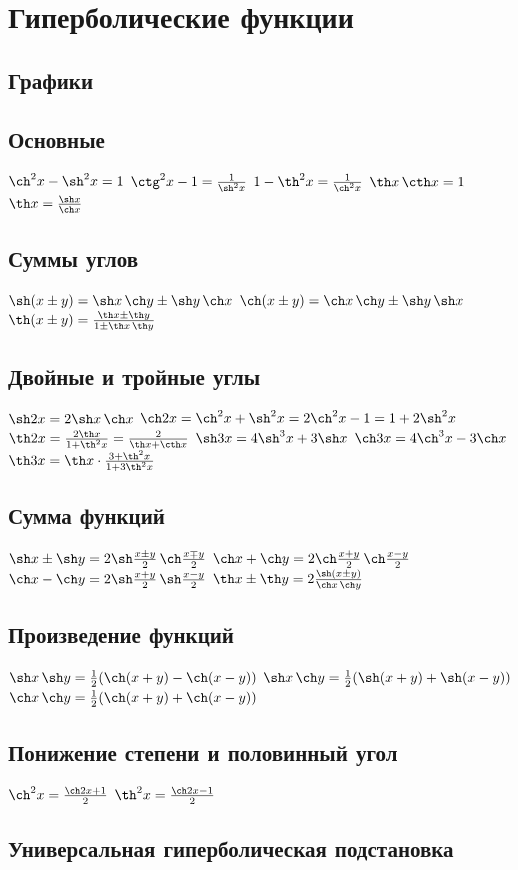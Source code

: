 \section{Гиперболические функции}
\subsection{Графики}
\subsection{Основные}
$ \ch^2 x - \sh^2 x = 1 $
$ \ctg^2 x - 1 = \frac{1}{\sh^2 x} $
$ 1 - \th^2 x = \frac{1}{\ch^2 x} $
$ \th x \, \cth x = 1 $
$ \th x = \frac{\sh x}{\ch x} $
\subsection{Суммы углов}
$ \sh(x \pm y) = \sh x \, \ch y \pm \sh y \, \ch x $
$ \ch(x \pm y) = \ch x \, \ch y \pm \sh y \, \sh x $
$ \th(x \pm y) = \frac{\th x \pm \th y}{1 \pm \th x \, \th y} $
\subsection{Двойные и тройные углы}
$ \sh 2x = 2\sh x \, \ch x $
$ \ch 2x = \ch^2 x + \sh^2 x = 2\ch^2 x - 1 = 1 + 2\sh^2 x $
$ \th 2x = \frac{2\th x}{1 + \th^2 x} = \frac{2}{\th x + \cth x} $
$ \sh 3x = 4\sh^3 x + 3\sh x $
$ \ch 3x = 4\ch^3 x - 3\ch x $
$ \th 3x = \th x \cdot \frac{3+\th^2 x}{1 + 3\th^2 x} $
\subsection{Сумма функций}
$ \sh x \pm \sh y = 2\sh\frac{x\pm y}{2}\,\ch\frac{x\mp y}{2} $
$ \ch x + \ch y = 2\ch\frac{x+y}{2}\,\ch\frac{x-y}{2} $
$ \ch x - \ch y = 2\sh\frac{x+ y}{2}\,\sh\frac{x- y}{2} $
$ \th x \pm \th y = 2\frac{\sh(x\pm y)}{\ch x\, \ch y} $
\subsection{Произведение функций}
$ \sh x \, \sh y = \frac12(\ch(x+y)-\ch(x-y)) $
$ \sh x \, \ch y = \frac12(\sh(x+y)+\sh(x-y)) $
$ \ch x \, \ch y = \frac12(\ch(x+y)+\ch(x-y)) $
\subsection{Понижение степени и половинный угол}
$ \ch^2 x = \frac{\ch 2x+1}{2} $
$ \th^2 x = \frac{\ch 2x-1}{2} $
\subsection{Универсальная гиперболическая подстановка}
